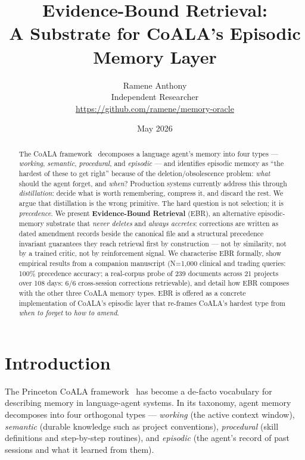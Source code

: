 \documentclass[11pt,a4paper]{article}
\title{Evidence-Bound Retrieval: \\
       A Substrate for CoALA's Episodic Memory Layer}
\author{Ramene Anthony \\
        Independent Researcher \\
        \url{https://github.com/ramene/memory-oracle}}
\date{May 2026}
\begin{document}
\maketitle

\begin{abstract}
The CoALA framework~\cite{sumers2024coala} decomposes a language agent's memory into four
types --- \emph{working}, \emph{semantic}, \emph{procedural}, and \emph{episodic} --- and
identifies episodic memory as ``the hardest of these to get right'' because of the
deletion/obsolescence problem: \emph{what} should the agent forget, and \emph{when}?
Production systems currently address this through \emph{distillation}: decide what is
worth remembering, compress it, and discard the rest. We argue that distillation is the
wrong primitive. The hard question is not selection; it is \emph{precedence}. We present
\textbf{Evidence-Bound Retrieval} (EBR), an alternative episodic-memory substrate that
\emph{never deletes} and \emph{always accretes}: corrections are written as dated
amendment records beside the canonical file and a structural precedence invariant
guarantees they reach retrieval first by construction --- not by similarity, not by a
trained critic, not by reinforcement signal. We characterise EBR formally, show empirical
results from a companion manuscript (N=1{,}000 clinical and trading queries: 100\%
precedence accuracy; a real-corpus probe of 239 documents across 21 projects over 108
days: 6/6 cross-session corrections retrievable), and detail how EBR composes with the
other three CoALA memory types. EBR is offered as a concrete implementation of CoALA's
episodic layer that re-frames CoALA's hardest type from \emph{when to forget} to
\emph{how to amend}.
\end{abstract}

\section{Introduction}
\label{sec:intro}

\noindent
The Princeton CoALA framework~\cite{sumers2024coala} has become a de-facto vocabulary
for describing memory in language-agent systems. In its taxonomy, agent memory
decomposes into four orthogonal types --- \emph{working} (the active context window),
\emph{semantic} (durable knowledge such as project conventions), \emph{procedural} (skill
definitions and step-by-step routines), and \emph{episodic} (the agent's record of past
sessions and what it learned from them).
\end{document}
